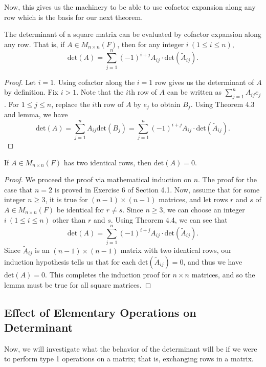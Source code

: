 Now, this gives us the machinery to be able to use cofactor expansion along any row which is the basis for our next theorem.

\begin{theorem}\label{Theorem 4.4}
    The determinant of a square matrix can be evaluated by cofactor expansion along any row. That is, if \( A \in {M}_{n \times n}(F) \), then for any integer \( i \ (1 \leq i \leq n ) \), 
    \[  \text{det}(A) = \sum_{ j=1 }^{ n } (-1)^{i +j} {A}_{ij} \cdot \text{det}({\tilde{A}}_{ij}). \]
\end{theorem}
\begin{proof}
Let \( i = 1  \). Using cofactor along the \( i = 1  \) row gives us the determinant of \( A  \) by definition. Fix \( i > 1  \). Note that the \( i  \)th row of \( A  \) can be written as \( \sum_{ j=1  }^{ n } {A}_{ij} {e}_{j} \). For \( 1 \leq j \leq n  \), replace the \( i \)th row of \( A  \) by \( {e}_{j} \) to obtain \( {B}_{j} \). Using Theorem 4.3 and lemma, we have 
\[  \text{det}(A) = \sum_{ j=1 }^{ n } {A}_{ij} \text{det}({B}_{j}) = \sum_{ j=1 }^{ n } (-1)^{i +j} {A}_{ij} \cdot \text{det}({\tilde{A}}_{ij}). \]
\end{proof}

\begin{corollary}\label{Corollary to Theorem 4.4}
    If \( A \in {M}_{n \times n}(F) \) has two identical rows, then \( \text{det}(A) = 0  \).
\end{corollary}
\begin{proof}
We proceed the proof via mathematical induction on \( n  \). The proof for the case that \( n = 2  \) is proved in Exercise 6 of Section 4.1. Now, assume that for some integer \( n \geq 3  \), it is true for \( (n-1) \times (n-1) \) matrices, and let rows \( r  \) and \( s  \) of \( A \in {M}_{n \times n}(F) \) be identical for \( r \neq s  \). Since \( n \geq 3  \), we can choose an integer \( i  \ (1 \leq i \leq n ) \) other than \( r  \) and \( s  \). Using Theorem 4.4, we can see that
\[  \text{det}(A) = \sum_{ j=1  }^{ n } (-1)^{i + j } {A}_{ij} \cdot \text{det}({\tilde{A}}_{ij}). \]
Since \( {\tilde{A}}_{ij} \) is an \( (n-1) \times (n-1) \) matrix with two identical rows, our induction hypothesis tells us that for each \( \text{det}({\tilde{A}}_{ij}) = 0  \), and thus we have \( \text{det}(A) = 0  \). This completes the induction proof for \( n \times n  \) matrices, and so the lemma must be true for all square matrices.
\end{proof}

\subsection{Effect of Elementary Operations on Determinant}
Now, we will investigate what the behavior of the determinant will be if we were to perform type 1 operations on a matrix; that is, exchanging rows in a matrix. 

